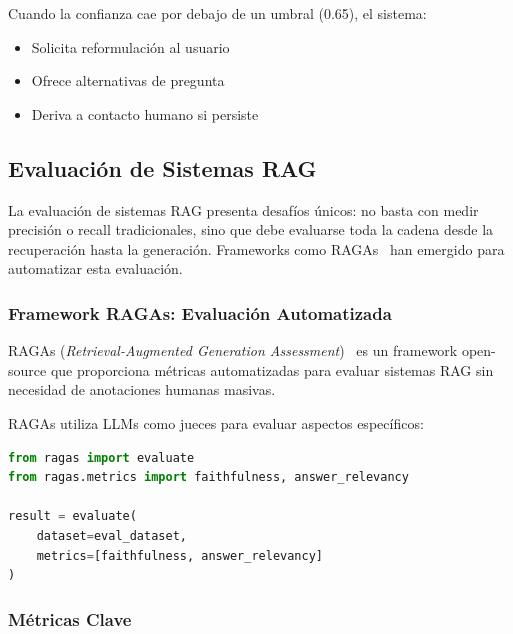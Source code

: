 Cuando la confianza cae por debajo de un umbral (0.65), el sistema:
\begin{itemize}
    \item Solicita reformulaci\'on al usuario
    \item Ofrece alternativas de pregunta
    \item Deriva a contacto humano si persiste
\end{itemize}

\subsection{Evaluaci\'on de Sistemas RAG}
\label{subsec:evaluacion-rag}

La evaluaci\'on de sistemas RAG presenta desaf\'ios \'unicos: no basta con medir precisi\'on o recall tradicionales, sino que debe evaluarse toda la cadena desde la recuperaci\'on hasta la generaci\'on. Frameworks como RAGAs~\cite{es2023ragas} han emergido para automatizar esta evaluaci\'on.

\subsubsection{Framework RAGAs: Evaluaci\'on Automatizada}
\label{subsubsec:ragas}

RAGAs (\textit{Retrieval-Augmented Generation Assessment})~\cite{es2023ragas} es un framework open-source que proporciona m\'etricas automatizadas para evaluar sistemas RAG sin necesidad de anotaciones humanas masivas.

RAGAs utiliza LLMs como jueces para evaluar aspectos espec\'ificos:

\begin{lstlisting}[language=Python, caption={Ejemplo de evaluaci\'on con RAGAs.}]
from ragas import evaluate
from ragas.metrics import faithfulness, answer_relevancy

result = evaluate(
    dataset=eval_dataset,
    metrics=[faithfulness, answer_relevancy]
)
\end{lstlisting}

\subsubsection{M\'etricas Clave}
\label{subsubsec:metricas-ragas}

